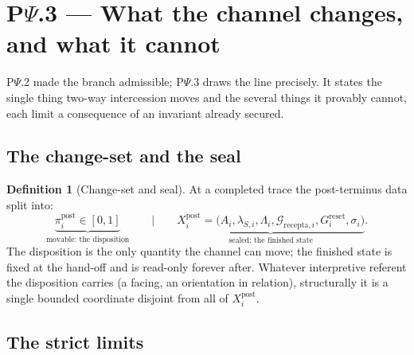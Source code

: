 \documentclass[11pt,a4paper]{article}
\theoremstyle{definition}
\newtheorem{definition}{Definition}[section]
\theoremstyle{plain}
\theoremstyle{remark}
\begin{document}
\section{P$\Psi$.3 --- What the channel changes, and what it cannot}

P$\Psi$.2 made the branch admissible; P$\Psi$.3 draws the line precisely. It states the single
thing two-way intercession moves and the several things it provably cannot, each limit a
consequence of an invariant already secured.

\subsection{The change-set and the seal}

\begin{definition}[Change-set and seal]\label{def:changeset}
At a completed trace the post-terminus data split into:
\[
\boxed{\;
\underbrace{\pi_i^{\mathrm{post}}\in[0,1]}_{\text{movable: the disposition}}
\qquad\Big|\qquad
\underbrace{X_i^{\mathrm{post}}=\bigl(A_i,\lambda_{S,i},\Lambda_i,\mathcal G_{\mathrm{recepta},i},G_i^{\mathrm{reset}},\sigma_i\bigr)}_{\text{sealed: the finished state}} .
\;}
\]
The disposition is the only quantity the channel can move; the finished state is fixed at the
hand-off and is read-only forever after. Whatever interpretive referent the disposition carries
(a facing, an orientation in relation), structurally it is a single bounded coordinate disjoint
from all of \(X_i^{\mathrm{post}}\).
\end{definition}

\subsection{The strict limits}
\end{document}
